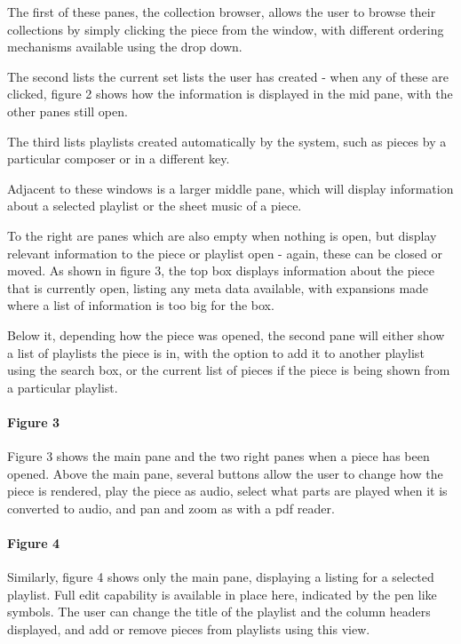 The first of these panes, the collection browser, allows the user to browse their collections by simply clicking the piece from the window, with different ordering mechanisms available using the drop down.

The second lists the current set lists the user has created - when any of these are clicked, figure 2 shows how the information is displayed in the mid pane, with the other panes still open. 

The third lists playlists created automatically by the system, such as pieces by a particular composer or in a different key.

Adjacent to these windows is a larger middle pane, which will display information about a selected playlist or the sheet music of a piece.

To the right are panes which are also empty when nothing is open, but display relevant information to the piece or playlist open - again, these can be closed or moved. 
As shown in figure 3, the top box displays information about the piece that is currently open, listing any meta data available, with expansions made where a list of information is too big for the box.

Below it, depending how the piece was opened, the second pane will either show a list of playlists the piece is in, with the option to add it to another playlist using the search box, or the current list of pieces if the piece is being shown from a particular playlist.


\paragraph{Figure 3} Figure 3 shows the main pane and the two right panes when a piece has been opened. Above the main pane, several buttons allow the user to change how the piece is rendered, play the piece as audio, select what parts are played when it is converted to audio, and pan and zoom as with a pdf reader.

\paragraph{Figure 4} Similarly, figure 4 shows only the main pane, displaying a listing for a selected playlist. Full edit capability is available in place here, indicated by the pen like symbols. The user can change the title of the playlist and the column headers displayed, and add or remove pieces from playlists using this view.

